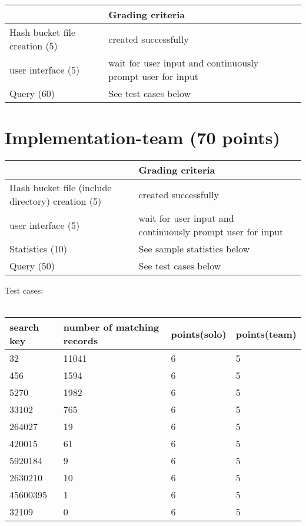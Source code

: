 \documentclass[10pt]{article}
\begin{document}
\begin{tabular}{ | l | l | l | }
  \hline
  & Grading criteria \\ \hline
  Hash bucket file creation (5) & created successfully \\ \hline
  user interface (5) & wait for user input and
  continuously prompt user for input \\ \hline
  Query (60) & See test cases below \\ \hline
\end{tabular}

\section{Implementation-team (70 points)}

\begin{tabular}{ | l | l | l | }
  \hline
  & Grading criteria \\ \hline
  Hash bucket file (include directory) creation (5) & created
  successfully \\ \hline 
  user interface (5) & wait for user input and
  continuously prompt user for input \\ \hline
  Statistics (10) & See sample statistics below \\ \hline
  Query (50) & See test cases below \\ \hline
\end{tabular}

\vspace{2em}
Test cases:\\\\
\begin{tabular}{ | l | l | l | l | }
  \hline
  search key & number of matching records & points(solo) &
  points(team) \\ \hline
  32 & 11041 & 6 & 5 \\ \hline
  456 & 1594 & 6 & 5 \\ \hline
  5270 & 1982 & 6 & 5 \\ \hline
  33102 & 765 & 6 & 5 \\ \hline
  264027 & 19 & 6 & 5 \\ \hline
  420015 & 61 & 6 & 5 \\ \hline
  5920184 & 9 & 6 & 5 \\ \hline
  2630210 & 10 & 6 & 5 \\ \hline
  45600395 & 1 & 6 & 5 \\ \hline
  32109 & 0 & 6 & 5 \\ \hline
\end{tabular}
\end{document}
